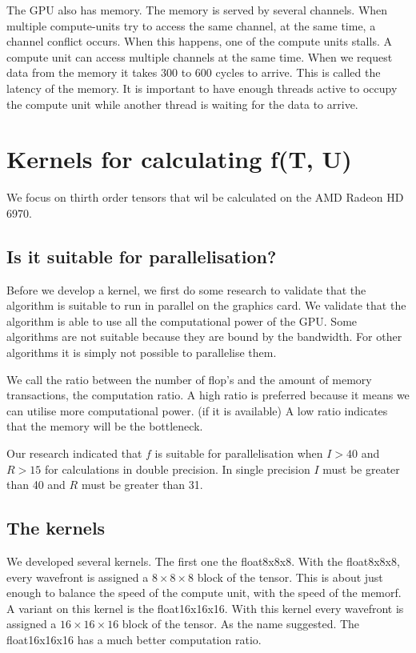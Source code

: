 \documentclass[11pt]{IEEEtran}
\begin{document}
The GPU also has memory. The memory is served by several channels. When multiple compute-units try to access the same channel, at the same time, a channel conflict occurs. When this happens, one of the compute units stalls. A compute unit can access multiple channels at the same time. When we request data from the memory it takes 300 to 600 cycles to arrive. This is called the latency of the memory. It is important to have enough threads active to occupy the compute unit while another thread is waiting for the data to arrive.

\section{Kernels for calculating f(T, U)}
We focus on thirth order tensors that wil be calculated on the AMD Radeon HD 6970.

\subsection{Is it suitable for parallelisation?}
Before we develop a kernel, we first do some research to validate that the algorithm is suitable to run in parallel on the graphics card. We validate that the algorithm is able to use all the computational power of the GPU. Some algorithms are not suitable because they are bound by the bandwidth. For other algorithms it is simply not possible to parallelise them.

We call the ratio between the number of flop's and the amount of memory transactions, the computation ratio. A high ratio is preferred because it means we can utilise more computational power. (if it is available) A low ratio indicates that the memory will be the bottleneck.

Our research indicated that $f$ is suitable for parallelisation when $I > 40$ and $R > 15$ for calculations in double precision. In single precision $I$ must be greater than 40 and $R$ must be greater than 31.

\subsection{The kernels}
 We developed several kernels. The first one the float8x8x8. With the float8x8x8, every wavefront is assigned a $8 \times 8 \times 8$ block of the tensor. This is about just enough to balance the speed of the compute unit, with the speed of the memorf. A variant on this kernel is the float16x16x16. With this kernel every wavefront is assigned a $16 \times 16 \times 16$ block of the tensor. As the name suggested. The float16x16x16 has a much better computation ratio.
 
\end{document}
